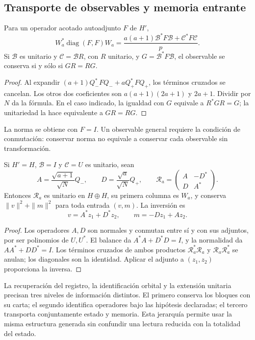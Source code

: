 \subsection{Transporte de observables y memoria entrante}
\label{v:subsec:acoplamiento-lectores}

\begin{theorem}
\label{v:thm:acoplamiento-lector}
Para un operador acotado autoadjunto \(F\) de \(H'\),
\[
 W_a^*\operatorname{diag}(F,F)W_a
 =\frac{a(a+1)\mathcal B^*F\mathcal B+\mathcal C^*F\mathcal C}{p}.
\]
Si \(\mathcal B\) es unitario y \(\mathcal C=\mathcal BR\), con
\(R\) unitario, y \(G=\mathcal B^*F\mathcal B\), el observable se
conserva si y sólo si \(GR=RG\).
\end{theorem}
\begin{proof}
Al expandir \((a+1)Q_-^*FQ_-+aQ_+^*FQ_+\), los términos cruzados
se cancelan. Los otros dos coeficientes son
\(a(a+1)(2a+1)\) y \(2a+1\). Dividir por \(N\) da la fórmula.
En el caso indicado, la igualdad con \(G\) equivale a \(R^*GR=G\);
la unitariedad la hace equivalente a \(GR=RG\).
\end{proof}

La norma se obtiene con \(F=I\). Un observable general requiere
la condición de conmutación: conservar norma no equivale a conservar
cada observable sin transformación.

\begin{theorem}
\label{v:thm:acoplamiento-memoria}
Si \(H'=H\), \(\mathcal B=I\) y \(\mathcal C=U\) es unitario, sean
\[
 A=\frac{\sqrt{a+1}}{\sqrt N}Q_-,\qquad
 D=\frac{\sqrt a}{\sqrt N}Q_+,\qquad
 \mathscr R_a=\begin{pmatrix}A&-D^*\\D&A^*\end{pmatrix}.
\]
Entonces \(\mathscr R_a\) es unitario en \(H\oplus H\), su primera
columna es \(W_a\), y conserva \(\|v\|^2+\|m\|^2\) para toda
entrada \((v,m)\). La inversión es
\[
 v=A^*z_1+D^*z_2,\qquad m=-Dz_1+Az_2.
\]
\end{theorem}
\begin{proof}
Los operadores \(A,D\) son normales y conmutan entre sí y con sus
adjuntos, por ser polinomios de \(U,U^*\). El balance da
\(A^*A+D^*D=I\), y la normalidad da \(AA^*+DD^*=I\).
Los términos cruzados de ambos productos
\(\mathscr R_a^*\mathscr R_a\) y \(\mathscr R_a\mathscr R_a^*\)
se anulan; los diagonales son la identidad. Aplicar el adjunto a
\((z_1,z_2)\) proporciona la inversa.
\end{proof}

La recuperación del registro, la identificación orbital y la extensión
unitaria precisan tres niveles de información distintos. El primero
conserva los bloques con su carta; el segundo identifica operadores bajo
las hipótesis declaradas; el tercero transporta conjuntamente estado y
memoria. Esta jerarquía permite usar la misma estructura generada sin
confundir una lectura reducida con la totalidad del estado.

